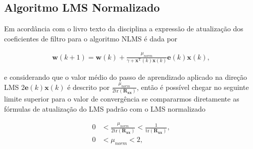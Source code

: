 



\clearpage


\subsection{Algoritmo LMS Normalizado} %
Em acordância com o livro texto da disciplina a expressão de atualização dos coeficientes de filtro para o algoritmo NLMS é dada por

\begin{align}
    \mathbf{w}(k+1) = \mathbf{w}(k) + \frac{\mu_{norm}}{\gamma + \mathbf{x}^{\text{T}}(k) \mathbf{x}(k)} \mathbf{e}(k) \mathbf{x}(k),
\end{align}

e considerando que o valor médio do passo de aprendizado aplicado na direção LMS $2 \mathbf{e}(k) \mathbf{x}(k)$ é descrito por $\frac{\mu_{norm}}{2 \text{tr}(\mathbf{R_{xx}})}$, então é possível chegar
no seguinte limite superior para o valor de convergência se compararmos diretamente as fórmulas de atualização do LMS padrão com o LMS normalizado

\begin{align}
    0 &< \frac{\mu_{norm}}{2 \text{tr}(\mathbf{R_{xx}})} < \frac{1}{\text{tr}(\mathbf{R_{xx}})}, \\
    0 &< \mu_{norm} < 2, 
\end{align}
        
